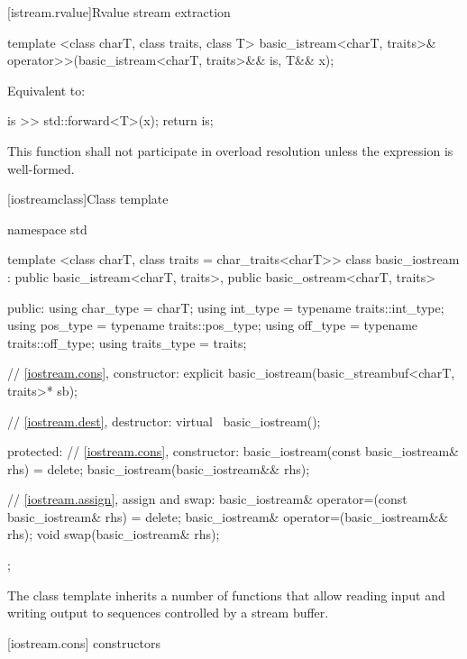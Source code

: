 [istream.rvalue]{Rvalue stream extraction}

%
\begin{itemdecl}
template <class charT, class traits, class T>
  basic_istream<charT, traits>&
  operator>>(basic_istream<charT, traits>&& is, T&& x);
\end{itemdecl}

\begin{itemdescr}
\pnum
\effects Equivalent to:
\begin{codeblock}
is >> std::forward<T>(x);
return is;
\end{codeblock}

\pnum
\remarks This function shall not participate in overload resolution
unless the expression  is well-formed.
\end{itemdescr}

[iostreamclass]{Class template }

%
\begin{codeblock}
namespace std {
  template <class charT, class traits = char_traits<charT>>
  class basic_iostream
    : public basic_istream<charT, traits>,
      public basic_ostream<charT, traits> {
  public:
    using char_type   = charT;
    using int_type    = typename traits::int_type;
    using pos_type    = typename traits::pos_type;
    using off_type    = typename traits::off_type;
    using traits_type = traits;

    // \ref{iostream.cons}, constructor:
    explicit basic_iostream(basic_streambuf<charT, traits>* sb);

    // \ref{iostream.dest}, destructor:
    virtual ~basic_iostream();

  protected:
    // \ref{iostream.cons}, constructor:
    basic_iostream(const basic_iostream& rhs) = delete;
    basic_iostream(basic_iostream&& rhs);

    // \ref{iostream.assign}, assign and swap:
    basic_iostream& operator=(const basic_iostream& rhs) = delete;
    basic_iostream& operator=(basic_iostream&& rhs);
    void swap(basic_iostream& rhs);
  };
}
\end{codeblock}

\pnum
The class template
inherits a number of functions that allow reading input and writing output to
sequences controlled by a stream buffer.

[iostream.cons]{ constructors}

